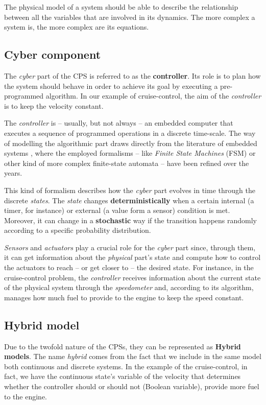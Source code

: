 The physical model of a system should be able to describe the relationship between all the variables that are involved in its dynamics.
The more complex a system is, the more complex are its equations.

\subsection{Cyber component}
The \textit{cyber} part of the CPS is referred to as the \textbf{controller}.
Its role is to plan how the system should behave in order to achieve its goal by executing a pre-programmed algorithm.
In our example of cruise-control, the aim of the \textit{controller} is to keep the velocity constant.

The \textit{controller} is -- usually, but not always \cite{JIISc-9303_distrCPS} -- an embedded computer that executes a sequence of programmed operations in a discrete time-scale.
The way of modelling the algorithmic part draws directly from the literature of embedded systems \cite{design_embedded_sys}, where the employed formalisms -- like \textit{Finite State Machines} (FSM) or other kind of more complex finite-state automata -- have been refined over the years.

This kind of formalism describes how the \textit{cyber} part evolves in time through the discrete \textit{states}.
The \textit{state} changes \textbf{deterministically} when a certain internal (a timer, for instance) or external (a value form a sensor) condition is met.
Moreover, it can change in a \textbf{stochastic} way if the transition happens randomly according to a specific probability distribution.

\textit{Sensors} and \textit{actuators} play a crucial role for the \textit{cyber} part since, through them, it can get information about the \textit{physical} part's state and compute how to control the actuators to reach -- or get closer to -- the desired state.
For instance, in the cruise-control problem, the \textit{controller} receives information about the current state of the physical system through the \textit{speedometer} and, according to its algorithm, manages how much fuel to provide to the engine to keep the speed constant.

\subsection{Hybrid model}
Due to the twofold nature of the CPSs, they can be represented as \textbf{Hybrid models}.
The name \textit{hybrid} comes from the fact that we include in the same model both continuous and discrete systems.
In the example of the cruise-control, in fact, we have the continuous state's variable of the velocity that determines whether the controller should or should not (Boolean variable), provide more fuel to the engine.

